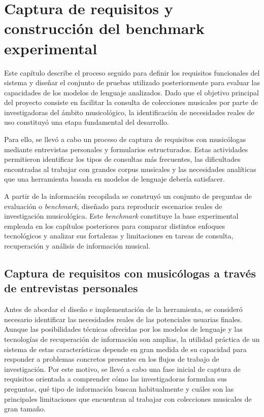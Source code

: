 \chapter{Captura de requisitos y construcción del benchmark experimental}
\label{cap:capitulo3}

Este capítulo describe el proceso seguido para definir los requisitos funcionales del sistema y diseñar el conjunto de pruebas utilizado posteriormente para evaluar las capacidades de los modelos de lenguaje analizados. Dado que el objetivo principal del proyecto consiste en facilitar la consulta de colecciones musicales por parte de investigadoras del ámbito musicológico, la identificación de necesidades reales de uso constituyó una etapa fundamental del desarrollo.

Para ello, se llevó a cabo un proceso de captura de requisitos con musicólogas mediante entrevistas personales y formularios estructurados. Estas actividades permitieron identificar los tipos de consultas más frecuentes, las dificultades encontradas al trabajar con grandes corpus musicales y las necesidades analíticas que una herramienta basada en modelos de lenguaje debería satisfacer.

A partir de la información recopilada se construyó un conjunto de preguntas de evaluación o \textit{benchmark}, diseñado para reproducir escenarios reales de investigación musicológica. Este \textit{benchmark} constituye la base experimental empleada en los capítulos posteriores para comparar distintos enfoques tecnológicos y analizar sus fortalezas y limitaciones en tareas de consulta, recuperación y análisis de información musical.

\section{Captura de requisitos con musicólogas a través de entrevistas personales}

Antes de abordar el diseño e implementación de la herramienta, se consideró necesario identificar las necesidades reales de las potenciales usuarias finales. Aunque las posibilidades técnicas ofrecidas por los modelos de lenguaje y las tecnologías de recuperación de información son amplias, la utilidad práctica de un sistema de estas características depende en gran medida de su capacidad para responder a problemas concretos presentes en los flujos de trabajo de investigación. Por este motivo, se llevó a cabo una fase inicial de captura de requisitos orientada a comprender cómo las investigadoras formulan sus preguntas, qué tipo de información buscan habitualmente y cuáles son las principales limitaciones que encuentran al trabajar con colecciones musicales de gran tamaño.

